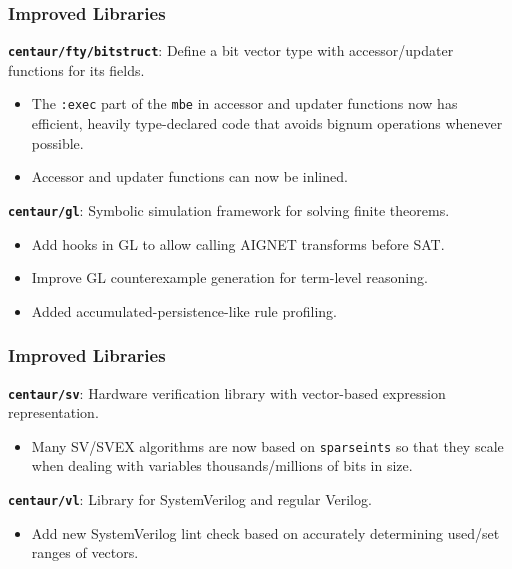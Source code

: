 \documentclass{beamer}
\newcommand{\code}[1]{\texttt{#1}}
\newcommand{\bookpath}[1]{\textbf{\code{#1}}}
\newcommand{\implibtitle}{\frametitle{Improved Libraries}}
\newcommand{\separation}{\vspace*{1ex}}
\begin{document}
\begin{frame}

\implibtitle

\bookpath{centaur/fty/bitstruct}:
Define a bit vector type with accessor/updater functions for its fields.
\begin{itemize}
\item
The \code{:exec} part of the \code{mbe} in accessor and updater
functions now has efficient, heavily type-declared code that avoids
bignum operations whenever possible.
\item
Accessor and updater functions can now be inlined.
\end{itemize}

\separation

\bookpath{centaur/gl}:
Symbolic simulation framework for solving finite theorems.
\begin{itemize}
\item
Add hooks in GL to allow calling AIGNET transforms before SAT.
\item
Improve GL counterexample generation for term-level reasoning.
\item
Added accumulated-persistence-like rule profiling.
\end{itemize}

\end{frame}


\begin{frame}

\implibtitle

\bookpath{centaur/sv}:
Hardware verification library with vector-based expression representation.
\begin{itemize}
\item
Many SV/SVEX algorithms are now based on \code{sparseints} so that they scale
when dealing with variables thousands/millions of bits in size.
\end{itemize}

\separation

\bookpath{centaur/vl}:
Library for SystemVerilog and regular Verilog.
\begin{itemize}
\item
Add new SystemVerilog lint check based on accurately determining
used/set ranges of vectors.
\end{itemize}

\end{frame}
\end{document}
